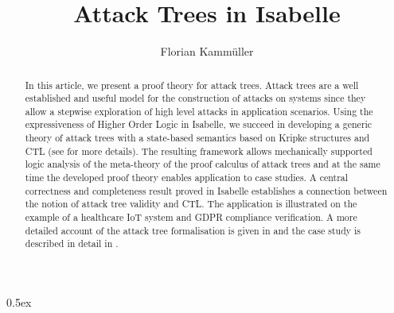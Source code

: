 \documentclass[11pt,a4paper]{article}
\begin{document}
\title{Attack Trees in Isabelle}
\author{Florian Kamm\"uller}

\maketitle

\begin{abstract}
In this article, we present a proof theory for attack trees. Attack trees are a well established and 
useful model for the construction of attacks on systems since they allow a stepwise exploration of 
high level attacks in application scenarios. Using the expressiveness of Higher Order Logic in Isabelle, 
we succeed in developing a generic theory of attack trees with a state-based semantics based on Kripke 
structures and CTL (see \cite{kam:16b} for more details). 
The resulting framework allows mechanically supported logic analysis of the meta-theory 
of the proof calculus of attack trees and at the same time the developed proof theory enables application 
to case studies. 
A central correctness and completeness result proved in Isabelle establishes a connection 
between the notion of attack tree validity and CTL. 
The application is illustrated on the example of a healthcare IoT system and GDPR compliance verification.
A more detailed account of the attack tree formalisation is given in \cite{kam:18b} and the case study 
is described in detail in \cite{kam:18a}.
\end{abstract}
\tableofcontents

\parindent 0pt\parskip 0.5ex





\end{document}

